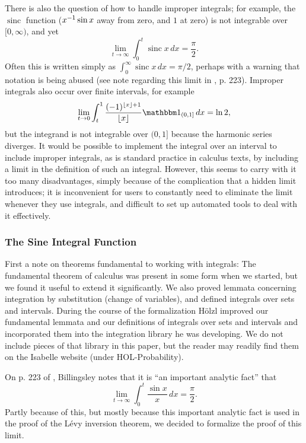 \documentclass[leqno]{article}
\theoremstyle{definition}
\newcommand\sinc{\mathop{\text{sinc}}\nolimits}
\newcommand\floor[1]{\lfloor {#1} \rfloor}
\begin{document}
There is also the question of how to handle improper integrals; for example, the $\sinc$ function ($x^{-1} \sin x$ away from zero, and $1$ at zero) is not integrable over $[0,\infty)$, and yet 
\[ \lim_{t \rightarrow \infty} \int_0^t \sinc x \, dx = \frac{\pi}{2}. \]
Often this is written simply as $\int_0^\infty \sinc x \, dx = \pi/2$, perhaps with a warning that notation is being abused (see note regarding this limit in \cite{billingsley}, p. 223). Improper integrals also occur over finite intervals, for example
\[ \lim_{t \rightarrow 0} \int_t^1 \frac{(-1)^{\floor x + 1}}{\floor x} \mathbbm 1_{(0,1]} \, dx = \ln 2, \]
but the integrand is not integrable over $(0,1]$ because the harmonic series diverges. It would be possible to implement the integral over an interval to include improper integrals, as is standard practice in calculus texts, by including a limit in the definition of such an integral. However, this seems to carry with it too many disadvantages, simply because of the complication that a hidden limit introduces; it is inconvenient for users to constantly need to eliminate the limit whenever they use integrals, and difficult to set up automated tools to deal with it effectively.

\subsubsection{The Sine Integral Function} \label{sec:Si}

First a note on theorems fundamental to working with integrals: The fundamental theorem of calculus was present in some form when we started, but we found it useful to extend it significantly. We also proved lemmata concerning integration by substitution (change of variables), and defined integrals over sets and intervals. During the course of the formalization H\"olzl improved our fundamental lemmata and our definitions of integrals over sets and intervals and incorporated them into the integration library he was developing. We do not include pieces of that library in this paper, but the reader may readily find them on the Isabelle website (under HOL-Probability).

On p. 223 of \cite{billingsley}, Billingsley notes that it is ``an important analytic fact'' that
\[ \lim_{t \rightarrow \infty} \int_0^t \frac{\sin x}{x} \, dx = \frac{\pi}{2}. \]
Partly because of this, but mostly because this important analytic fact is used in the proof of the L\'evy inversion theorem, we decided to formalize the proof of this limit.
\end{document}
